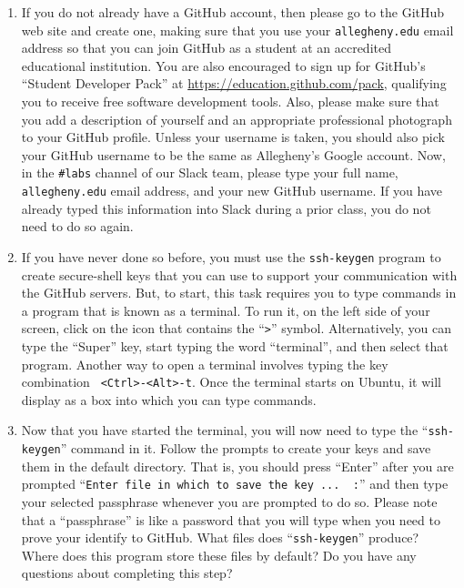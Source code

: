 \documentclass[11pt]{article}
\newcommand{\command}[1]{``\lstinline{#1}''}
\begin{document}
\begin{enumerate}

  \item If you do not already have a GitHub account, then please go to the GitHub web site and create one, making sure
    that you use your {\tt allegheny.edu} email address so that you can join GitHub as a student at an accredited
    educational institution. You are also encouraged to sign up for GitHub's ``Student Developer Pack'' at
    \url{https://education.github.com/pack}, qualifying you to receive free software development tools. Also, please
    make sure that you add a description of yourself and an appropriate professional photograph to your GitHub profile.
    Unless your username is taken, you should also pick your GitHub username to be the same as Allegheny's Google
    account. Now, in the {\tt \#labs} channel of our Slack team, please type your full name, {\tt allegheny.edu} email
    address, and your new GitHub username. If you have already typed this information into Slack during a prior class,
    you do not need to do so again.

  \item If you have never done so before, you must use the {\tt ssh-keygen} program to create secure-shell keys that you
    can use to support your communication with the GitHub servers. But, to start, this task requires you to type
    commands in a program that is known as a terminal. To run it, on the left side of your screen, click on the icon
    that contains the \command{>} symbol. Alternatively, you can type the ``Super'' key, start typing the word
    ``terminal'', and then select that program. Another way to open a terminal involves typing the key combination {\tt
    <Ctrl>-<Alt>-t}. Once the terminal starts on Ubuntu, it will display as a box into which you can type commands.

  \item Now that you have started the terminal, you will now need to type the \command{ssh-keygen} command in it. Follow
    the prompts to create your keys and save them in the default directory. That is, you should press ``Enter'' after you
    are prompted \command{Enter file in which to save the key ...  :} and then type your selected passphrase whenever you
    are prompted to do so. Please note that a ``passphrase'' is like a password that you will type when you need to prove
    your identify to GitHub. What files does \command{ssh-keygen} produce? Where does this program store these files by
    default? Do you have any questions about completing this step?


\end{enumerate}
\end{document}

